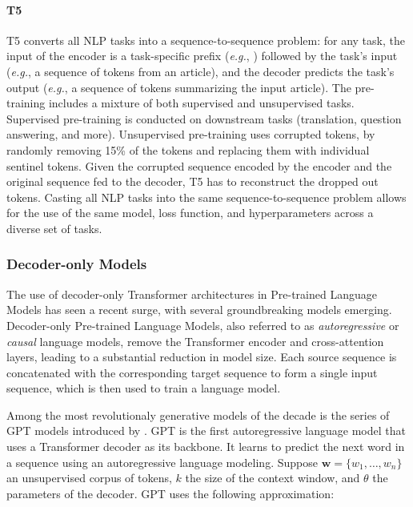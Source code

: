 \paragraph{T5} \ac{T5} \citep{raffel2020exploring} converts all \ac{NLP} tasks into a sequence-to-sequence problem: for any task, the input of the encoder is a task-specific prefix (\textit{e.g.}, ) followed by the task's input (\textit{e.g.}, a sequence of tokens from an article), and the decoder predicts the task's output (\textit{e.g.}, a sequence of tokens summarizing the input article). The pre-training includes a mixture of both supervised and unsupervised tasks. Supervised pre-training is conducted on downstream tasks (translation, question answering, and more). Unsupervised pre-training uses corrupted tokens, by randomly removing 15\% of the tokens and replacing them with individual sentinel tokens. Given the corrupted sequence encoded by the encoder and the original sequence fed to the decoder, \ac{T5} has to reconstruct the dropped out tokens. Casting all \ac{NLP} tasks into the same sequence-to-sequence problem allows for the use of the same model, loss function, and hyperparameters across a diverse set of tasks. 

\subsubsection{Decoder-only Models}

The use of decoder-only Transformer architectures in Pre-trained Language Models has seen a recent surge, with several groundbreaking models \citep{radford2018improving, brown2020language, ouyang2022training, touvron2023llama} emerging. Decoder-only Pre-trained Language Models, also referred to as \textit{autoregressive} or \textit{causal} language models, remove the Transformer encoder and cross-attention layers, leading to a substantial reduction in model size. Each source sequence is concatenated with the corresponding target sequence to form a single input sequence, which is then used to train a language model. 

Among the most revolutionaly generative models of the decade is the series of \ac{GPT} models introduced by \citep{radford2018improving}. \ac{GPT} is the first autoregressive language model that uses a Transformer decoder as its backbone. It learns to predict the next word in a sequence using an autoregressive language modeling. Suppose $\bm{w} = \{w_1, \ldots, w_n\}$ an unsupervised corpus of tokens, $k$ the size of the context window, and $\theta$ the parameters of the decoder. 
\ac{GPT} uses the following approximation:

